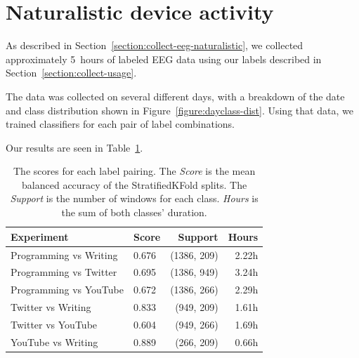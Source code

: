    \section{Naturalistic device activity}

        As described in Section~\ref{section:collect-eeg-naturalistic}, we collected approximately \SI{5}{hours} of labeled EEG data using our labels described in Section~\ref{section:collect-usage}. 

        The data was collected on several different days, with a breakdown of the date and class distribution shown in Figure~\ref{figure:dayclass-dist}. Using that data, we trained classifiers for each pair of label combinations. 

        Our results are seen in Table~\ref{table:scores-natural}.


        \begin{table}[h]
            \centering
            \begin{tabular}{llrr}
                \toprule
                \textbf{Experiment} & \textbf{Score} & \textbf{Support} & \textbf{Hours} \\
                \midrule
                Programming vs Writing & 0.676 & (1386, 209) & 2.22h \\
                Programming vs Twitter & 0.695 &  (1386, 949) & 3.24h \\
                Programming vs YouTube & 0.672 &  (1386, 266) & 2.29h \\
                Twitter vs Writing & 0.833 &  (949, 209) & 1.61h \\
                Twitter vs YouTube & 0.604 & (949, 266) & 1.69h \\
                YouTube vs Writing & 0.889 &  (266, 209) & 0.66h \\
                \bottomrule
            \end{tabular}
            \caption{The scores for each label pairing. The \textit{Score} is the mean balanced accuracy of the StratifiedKFold splits. The \textit{Support} is the number of windows for each class. \textit{Hours} is the sum of both classes' duration.}\label{table:scores-natural}
        \end{table}

